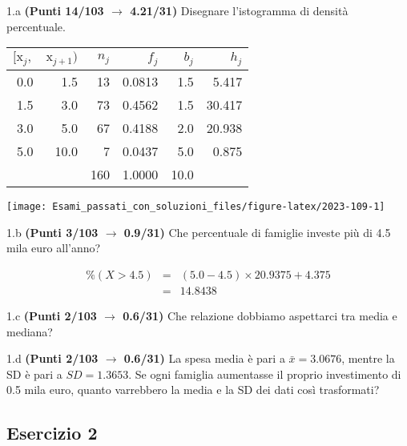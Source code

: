 \documentclass[
  11pt,
]{book}
\theoremstyle{mytheoremstyle}
\theoremstyle{mydefstyle}
\newenvironment{sol}
  {
  \begin{tcolorbox}[enhanced,breakable,arc=0.1mm,boxrule=1pt,colback=white,colframe=iblue,
  title=\bf \fontfamily{lmss}\selectfont \hspace{.5 cm} Soluzione,drop fuzzy shadow]

}{
\end{tcolorbox}
  }
\begin{document}
1.a \textbf{(Punti 14/103 \(\rightarrow\) 4.21/31)} Disegnare l'istogramma di densità percentuale.

\begin{sol}

\begin{table}[H]
\centering
\begin{tabular}{rrrrrr}
\toprule
$[\text{x}_j,$ & $\text{x}_{j+1})$ & $n_j$ & $f_j$ & $b_j$ & $h_j$\\
\midrule
0.0 & 1.5 & 13 & 0.0813 & 1.5 & 5.417\\
1.5 & 3.0 & 73 & 0.4562 & 1.5 & 30.417\\
3.0 & 5.0 & 67 & 0.4188 & 2.0 & 20.938\\
5.0 & 10.0 & 7 & 0.0437 & 5.0 & 0.875\\
 &  & 160 & 1.0000 & 10.0 & \\
\bottomrule
\end{tabular}
\end{table}

\begin{center}\texttt{[image: Esami\_passati\_con\_soluzioni\_files/figure-latex/2023-109-1]} \end{center}

\end{sol}

1.b \textbf{(Punti 3/103 \(\rightarrow\) 0.9/31)} Che percentuale di famiglie investe più di 4.5 mila euro all'anno?

\begin{sol}
\begin{eqnarray*}
  \%(X>4.5) &=&  (5.0-4.5)\times20.9375+4.375\\
  &=& 14.8438
\end{eqnarray*}

\end{sol}

1.c \textbf{(Punti 2/103 \(\rightarrow\) 0.6/31)} Che relazione dobbiamo aspettarci tra media e mediana?

1.d \textbf{(Punti 2/103 \(\rightarrow\) 0.6/31)} La spesa media è pari a \(\bar x=3.0676\), mentre la SD è pari a \(SD=1.3653\).
Se ogni famiglia aumentasse il proprio investimento di 0.5 mila euro, quanto varrebbero la media e la SD dei dati così trasformati?

\subsection{Esercizio 2}\label{esercizio-2-20}
\end{document}
